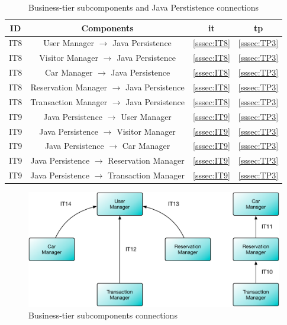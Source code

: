 \begin{table}[htbp]
\begin{center}
\begin{tabular}[t]{cccc}

\hline
\textbf{ID} & \textbf{Components} & \textbf{\acs{it}} & \textbf{\acs{tp}}\\
\hline
IT8 & \enspace User Manager $\rightarrow$ Java Persistence \enspace & \ref{sssec:IT8} & \ref{sssec:TP3}\\
\hline
IT8 & \enspace Visitor Manager $\rightarrow$ Java Persistence \enspace & \ref{sssec:IT8} & \ref{sssec:TP3}\\
\hline
IT8 & \enspace Car Manager $\rightarrow$ Java Persistence \enspace & \ref{sssec:IT8} & \ref{sssec:TP3}\\
\hline
IT8 & \enspace Reservation Manager $\rightarrow$ Java Persistence \enspace & \ref{sssec:IT8} & \ref{sssec:TP3}\\
\hline
IT8 & \enspace Transaction Manager $\rightarrow$ Java Persistence \enspace & \ref{sssec:IT8} & \ref{sssec:TP3}\\
\hline
IT9 & \enspace Java Persistence $\rightarrow$ User Manager \enspace & \ref{sssec:IT9} & \ref{sssec:TP3}\\
\hline
IT9 & \enspace Java Persistence $\rightarrow$ Visitor Manager \enspace & \ref{sssec:IT9} & \ref{sssec:TP3}\\
\hline
IT9 & \enspace Java Persistence $\rightarrow$ Car Manager \enspace & \ref{sssec:IT9} & \ref{sssec:TP3}\\
\hline
IT9 & \enspace Java Persistence $\rightarrow$ Reservation Manager \enspace & \ref{sssec:IT9} & \ref{sssec:TP3}\\
\hline
IT9 & \enspace Java Persistence $\rightarrow$ Transaction Manager \enspace & \ref{sssec:IT9} & \ref{sssec:TP3}\\
\hline

\end{tabular}
\caption{Business-tier subcomponents and Java Perstistence connections}
\end{center}
\end{table}

\clearpage

\vspace{120pt}
\begin{figure}[htbp]
\centering
\includegraphics[width=\textwidth]{Images/IT10-14.pdf}
\vspace{16pt}

\label{fig:it10-14}
\caption{Business-tier subcomponents connections}
\end{figure}
\vspace{16pt}

